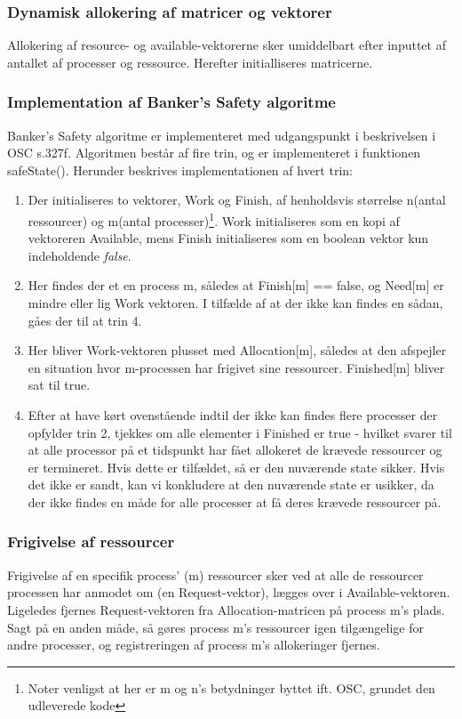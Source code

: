 \subsubsection*{Dynamisk allokering af matricer og vektorer}
Allokering af resource- og available-vektorerne sker umiddelbart efter inputtet af antallet af processer og ressource. Herefter initialliseres matricerne.

\subsubsection*{Implementation af Banker's Safety algoritme}
Banker's Safety algoritme er implementeret med udgangspunkt i beskrivelsen i OSC s.327f. Algoritmen består af fire trin, og er implementeret i funktionen safeState(). Herunder beskrives implementationen af hvert trin:
\begin{enumerate}
	\item Der initialiseres to vektorer, Work og Finish, af henholdsvis størrelse n(antal ressourcer) og m(antal processer)\footnote{Noter venligst at her er m og n's betydninger byttet ift. OSC, grundet den udleverede kode}. Work initialiseres som en kopi af vektoreren Available, mens Finish initialiseres som en boolean vektor kun indeholdende \textit{false}.
	\item Her findes der et en process m, således at Finish[m] == false, og Need[m] er mindre eller lig Work vektoren. I tilfælde af at der ikke kan findes en sådan, gåes der til at trin 4.
	\item Her bliver Work-vektoren plusset med Allocation[m], således at den afspejler en situation hvor m-processen har frigivet sine ressourcer. Finished[m] bliver sat til true.
	\item Efter at have kørt ovenstående indtil der ikke kan findes flere processer der opfylder trin 2, tjekkes om alle elementer i Finished er true - hvilket svarer til at alle processor på et tidspunkt har fået allokeret de krævede ressourcer og er termineret. Hvis dette er tilfældet, så er den nuværende state sikker. Hvis det ikke er sandt, kan vi konkludere at den nuværende state er usikker, da der ikke findes en måde for alle processer at få deres krævede ressourcer på.
\end{enumerate}

\subsubsection*{Frigivelse af ressourcer}
Frigivelse af en specifik process' (m) ressourcer sker ved at alle de ressourcer processen har anmodet om (en Request-vektor), lægges over i Available-vektoren. Ligeledes fjernes Request-vektoren fra Allocation-matricen på process m's plads. Sagt på en anden måde, så gøres process m's ressourcer igen tilgængelige for andre processer, og registreringen af process m's allokeringer fjernes.

